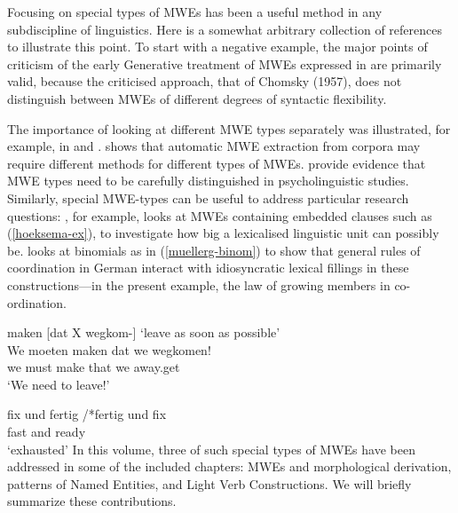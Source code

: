 \documentclass[output=paper]{langsci/langscibook}
\begin{document}
Focusing on special types of MWEs has been a useful method in any subdiscipline of linguistics. Here is a somewhat arbitrary collection of references to illustrate this point. To start with a negative example, the major points of criticism of the early Generative treatment of MWEs expressed in \cite{Chafe:68} are primarily valid, because the criticised approach, that of Chomsky (1957), does not distinguish between MWEs of different degrees of syntactic flexibility. 

The importance of looking at different MWE types separately was illustrated, for example, in \citet{Krenn:99} and \citet{Gibbs1989a}. \citet{Krenn:99} shows that automatic MWE extraction from corpora may require different methods for different types of MWEs. \citet{Gibbs1989a} provide evidence that MWE types need to be carefully distinguished in psycholinguistic studies. Similarly, special MWE-types can be useful to address particular research questions: \citet{Hoeksema:10idiom}, for example, looks at MWEs containing embedded clauses such as (\ref{hoeksema-ex}), to investigate how big a lexicalised linguistic unit can possibly be. \cite{MuellerG:98} looks at binomials as in (\ref{muellerg-binom}) to show that general rules of coordination in German interact with idiosyncratic lexical fillings in these constructions---in the present example, the law of growing members in co-ordination.

 \ea
\label{hoeksema-ex}
\settowidth {} 
maken [dat X wegkom-] ‘leave as soon as possible’ \\ 
\gll We moeten maken dat we wegkomen!\\
we must make that we away.get\\  
\glt‘We need to leave!’
\z

\ea
\label{muellerg-binom}
\settowidth {}
\gll fix und fertig /*fertig und fix\\ 
fast and ready\\ 
\glt ‘exhausted’
\z
In this volume, three of such special types of MWEs have been addressed in some of the included chapters: MWEs and morphological derivation, patterns of Named Entities, and Light Verb Constructions. We will briefly summarize these contributions.
\end{document}
